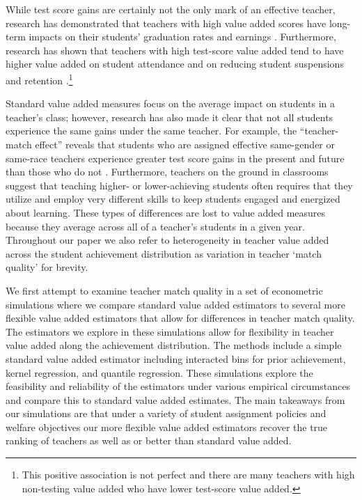 \documentclass[letterpaper,12pt]{article}
\begin{document}
While test score gains are certainly not the only mark of an effective teacher, research has demonstrated that teachers with high value added scores have long-term impacts on their students' graduation rates and earnings \citep{chetty2014measuring2}. Furthermore, research has shown that teachers with high test-score value added tend to have higher value added on student attendance and on reducing student suspensions and retention \citep{pope2017multidimensional}.\footnote{This positive association is not perfect and there are many teachers with high non-testing value added who have lower test-score value added.} 

Standard value added measures focus on the average impact on students in a teacher's class; however, research has also made it clear that not all students experience the same gains under the same teacher. For example, the ``teacher-match effect'' reveals that students who are assigned effective same-gender or same-race teachers experience greater test score gains in the present and future than those who do not \citep{dee2005teacher,delhommer2019highschool}. Furthermore, teachers on the ground in classrooms suggest that teaching higher- or lower-achieving students often requires that they utilize and employ very different skills to keep students engaged and energized about learning. These types of differences are lost to value added measures because they average across all of a teacher's students in a given year. Throughout our paper we also refer to heterogeneity in teacher value added across the student achievement distribution as variation in teacher `match quality' for brevity.

We first attempt to examine teacher match quality in a set of econometric simulations where we compare standard value added estimators to several more flexible value added estimators that allow for differences in teacher match quality. The estimators we explore in these simulations allow for flexibility in teacher value added along the achievement distribution. The methods include a simple standard value added estimator including interacted bins for prior achievement, kernel regression, and quantile regression. These simulations explore the feasibility and reliability of the estimators under various empirical circumstances and compare this to standard value added estimates. The main takeaways from our simulations are that under a variety of student assignment policies and welfare objectives our more flexible value added estimators recover the true ranking of teachers as well as or better than standard value added.
\end{document}
